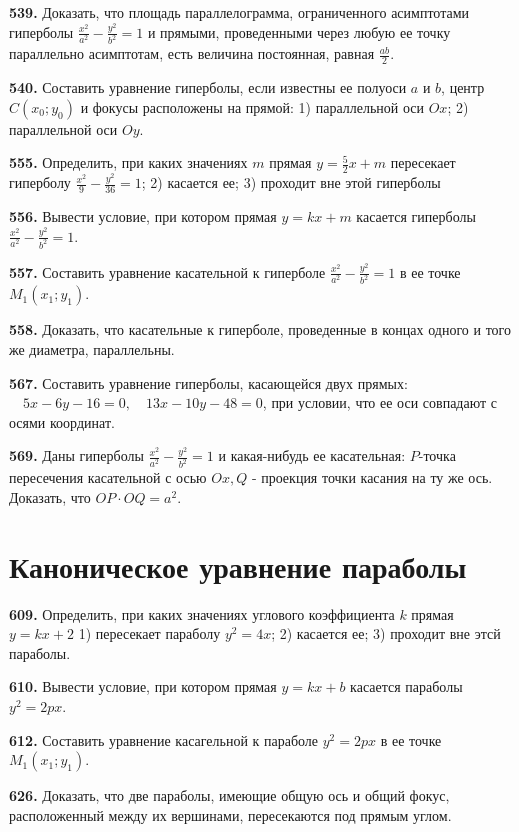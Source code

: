 \textbf{539.} Доказать, что площадь параллелограмма, ограниченного асимптотами гиперболы $\frac{x^2}{a^2}-\frac{y^2}{b^2}=1$ и прямыми, проведенными через любую ее точку параллельно асимптотам, есть величина постоянная, равная $\frac{a b}{2}$.

\textbf{540.} Составить уравнение гиперболы, если известны ее полуоси $a$ и $b$, центр $C\left(x_0 ; y_0\right)$ и фокусы расположены на прямой: 1) параллельной оси $O x$; 2) параллельной оси $O y$.

\textbf{555.} Определить, при каких значениях $m$ прямая $y=\frac{5}{2} x+m$ пересекает гиперболу $\frac{x^2}{9}-\frac{y^2}{36}=1$; 2) касается ее; 3) проходит вне этой гиперболы

\textbf{556.} Вывести условие, при котором прямая $y=k x+m$ касается гиперболы $\frac{x^2}{a^2}-\frac{y^2}{b^2}=1$.

\textbf{557.} Составить уравнение касательной к гиперболе $\frac{x^2}{a^2}-\frac{y^2}{b^2}=1$ в ее точке $M_1\left(x_1 ; y_1\right)$.

\textbf{558.} Доказать, что касательные к гиперболе, проведенные в концах одного и того же диаметра, параллельны.

\textbf{567.} Составить уравнение гиперболы, касающейся двух прямых: $\quad 5 x-6 y-16=0, \quad 13 x-10 y-48=0$, при условии, что ее оси совпадают с осями координат.

\textbf{569.} Даны гиперболы $\frac{x^2}{a^2}-\frac{y^2}{b^2}=1$ и какая-нибудь ее касательная: $P$-точка пересечения касательной с осью $O x, Q$ - проекция точки касания на ту же ось. Доказать, что $O P \cdot O Q=a^2$.



\section{Каноническое уравнение параболы}


\textbf{609.} Определить, при каких значениях углового коэффициента $k$ прямая $y=k x+2$ 1) пересекает параболу $y^2=4 x$; 2) касается ее; 3) проходит вне этсй параболы.

\textbf{610.} Вывести условие, при котором прямая $y=k x+b$ касается параболы $y^2=2 p x$.

\textbf{612.} Составить уравнение касагельной к параболе $y^2=2 p x$ в ее точке $M_1\left(x_1 ; y_1\right)$.

\textbf{626.} Доказать, что две параболы, имеющие общую ось и общий фокус, расположенный между их вершинами, пересекаются под прямым углом.

